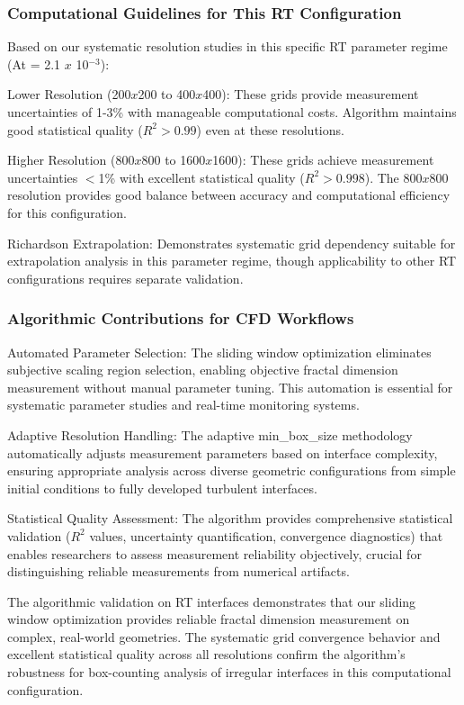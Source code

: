 \documentclass[preprint,12pt]{elsarticle}
\def\textbf#1{#1}%
\def\times{x}%
\begin{document}
\subsubsection{Computational Guidelines for This RT Configuration}

Based on our systematic resolution studies in this specific RT parameter regime (At = 2.1 $\times$ 10$^{-3}$):

\textbf{Lower Resolution (200$\times$200 to 400$\times$400):} These grids provide measurement uncertainties of 1-3\% with manageable computational costs. Algorithm maintains good statistical quality ($R^2 > 0.99$) even at these resolutions.

\textbf{Higher Resolution (800$\times$800 to 1600$\times$1600):} These grids achieve measurement uncertainties $<$1\% with excellent statistical quality ($R^2 > 0.998$). The 800$\times$800 resolution provides good balance between accuracy and computational efficiency for this configuration.

\textbf{Richardson Extrapolation:} Demonstrates systematic grid dependency suitable for extrapolation analysis in this parameter regime, though applicability to other RT configurations requires separate validation.

\subsubsection{Algorithmic Contributions for CFD Workflows}

\textbf{Automated Parameter Selection:} The sliding window optimization eliminates subjective scaling region selection, enabling objective fractal dimension measurement without manual parameter tuning. This automation is essential for systematic parameter studies and real-time monitoring systems.

\textbf{Adaptive Resolution Handling:} The adaptive min\_box\_size methodology automatically adjusts measurement parameters based on interface complexity, ensuring appropriate analysis across diverse geometric configurations from simple initial conditions to fully developed turbulent interfaces.

\textbf{Statistical Quality Assessment:} The algorithm provides comprehensive statistical validation ($R^2$ values, uncertainty quantification, convergence diagnostics) that enables researchers to assess measurement reliability objectively, crucial for distinguishing reliable measurements from numerical artifacts.

The algorithmic validation on RT interfaces demonstrates that our sliding window optimization provides reliable fractal dimension measurement on complex, real-world geometries. The systematic grid convergence behavior and excellent statistical quality across all resolutions confirm the algorithm's robustness for box-counting analysis of irregular interfaces in this computational configuration.
\end{document}
